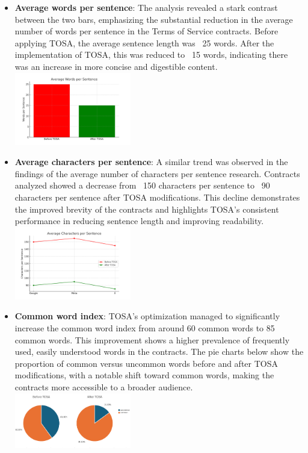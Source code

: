 \documentclass[sigconf, nonacm]{acmart}
\begin{document}
\begin{itemize}
\item \textbf{Average words per sentence}: The analysis revealed a stark contrast between the two bars, emphasizing the substantial reduction in the average number of words per sentence in the Terms of Service contracts. Before applying TOSA, the average sentence length was ~25 words. After the implementation of TOSA, this was reduced to ~15 words, indicating there was an increase in more concise and digestible content.
{\center\includegraphics[width=0.4\textwidth]{./resources/avg_words_per_sentence_updated}}

\item \textbf{Average characters per sentence}: A similar trend was observed in the findings of the average number of characters per sentence research. Contracts analyzed showed a decrease from ~150 characters per sentence to ~90 characters per sentence after TOSA modifications. This decline demonstrates the improved brevity of the contracts and highlights TOSA’s consistent performance in reducing sentence length and improving readability.
{\center\includegraphics[width=0.4\textwidth]{./resources/avg_chars_per_sentence_updated}}

\item \textbf{Common word index}: TOSA’s optimization managed to significantly increase the common word index from around 60 common words to 85 common words. This improvement shows a higher prevalence of frequently used, easily understood words in the contracts. The pie charts below show the proportion of common versus uncommon words before and after TOSA modifications, with a notable shift toward common words, making the contracts more accessible to a broader audience.
{\center\includegraphics[width=0.4\textwidth]{./resources/common_word_index_updated}}


\end{itemize}
\end{document}
